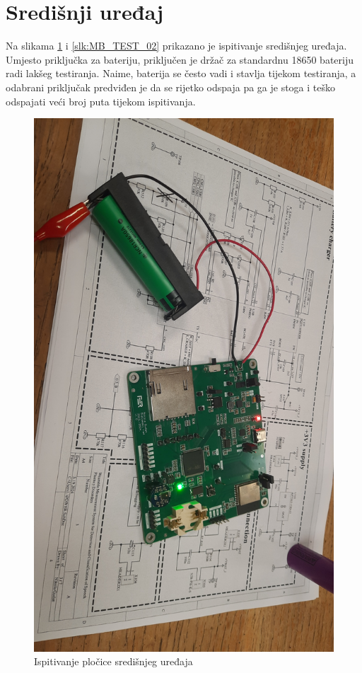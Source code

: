 \section{Središnji uređaj}
Na slikama \ref{slk:MB_TEST_01} i \ref{slk:MB_TEST_02} prikazano je ispitivanje središnjeg uređaja. Umjesto priključka za bateriju, priključen je držač za standardnu 18650 bateriju radi lakšeg testiranja. Naime, baterija se često vadi i stavlja tijekom testiranja, a odabrani priključak predviđen je da se rijetko odspaja pa ga je stoga i teško odspajati veći broj puta tijekom ispitivanja.
\begin{figure}[htb]
    \centering
    \includegraphics[width=10 cm]{Figures/MB_TEST_01.jpg}
    \caption{Ispitivanje pločice središnjeg uređaja}
    \label{slk:MB_TEST_01}
\end{figure}
